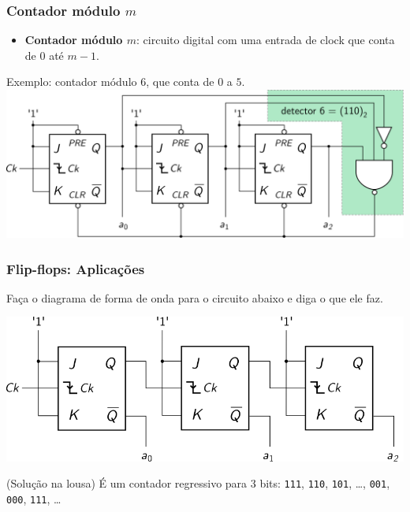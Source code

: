 \documentclass{beamer}
\begin{document}
\begin{frame}
\frametitle{Contador módulo $m$}

{\small
\begin{itemize}
\item \textbf{Contador módulo $m$}: circuito digital com uma
entrada de clock que conta de $0$ até $m-1$.
\end{itemize}

Exemplo: contador módulo $6$, que conta de $0$ a $5$.\\[12pt]
\includegraphics[width=\textwidth]{images/counter_modulo6}

}
\end{frame}

\begin{frame}
\frametitle{Flip-flops: Aplicações}

Faça o diagrama de forma de onda para o circuito abaixo
e diga o que ele faz.

\vspace{12pt}

\includegraphics[width=\textwidth]{images/downcounter}

(Solução na lousa) \pause É um contador regressivo para
$3$ bits: \texttt{111}, \texttt{110}, \texttt{101},
\ldots, \texttt{001}, \texttt{000}, \texttt{111}, \ldots

\end{frame}
\end{document}
